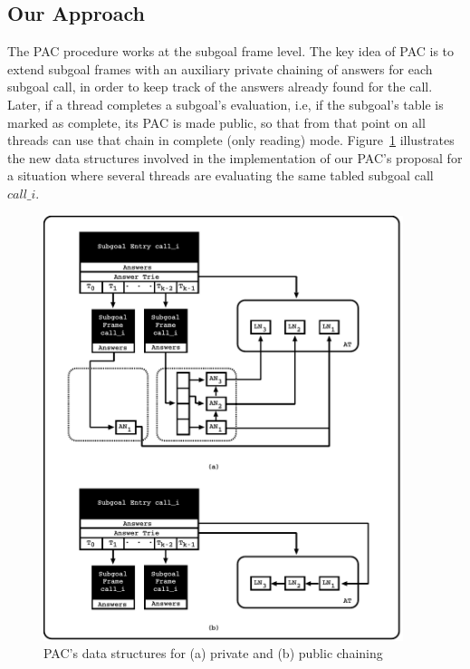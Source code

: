 \documentclass{llncs}
\begin{document}

\subsection{Our Approach}

The PAC procedure works at the subgoal frame level. The key idea of
PAC is to extend subgoal frames with an auxiliary private chaining of
answers for each subgoal call, in order to keep track of the answers
already found for the call. Later, if a thread completes a subgoal's
evaluation, i.e, if the subgoal's table is marked as complete, its PAC
is made public, so that from that point on all threads can use that
chain in complete (only reading) mode. Figure~\ref{fig_tabtries_pcc}
illustrates the new data structures involved in the implementation of
our PAC's proposal for a situation where several threads are
evaluating the same tabled subgoal call $call\_i$.

\begin{figure}[!ht]
\vspace{-\intextsep}
\centering
\includegraphics[width=10.5cm]{figures/pcc.pdf}
\caption{PAC's data structures for (a) private and (b) public
  chaining}
\label{fig_tabtries_pcc}
\vspace{-0.5\intextsep}
\end{figure}
\end{document}
